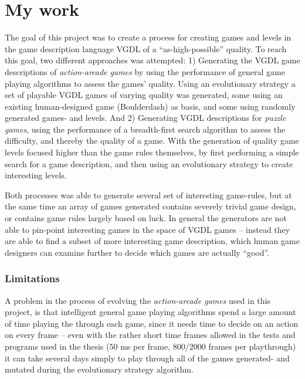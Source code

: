 \documentclass[a4paper,titlepage,final]{report}
\begin{document}
\section{My work}
The goal of this project was to create a process for creating games and levels in the game description language VGDL of a ``as-high-possible'' quality.
To reach this goal, two different approaches was attempted:
1) Generating the VGDL game descriptions of \textit{action-arcade games} by using the performance of general game playing algorithms to assess the games' quality.
Using an evolutionary strategy a set of playable VGDL games of varying quality was generated, some using an existing human-designed game (Boulderdash) as basis, and some using randomly generated games- and levels.
And 2) Generating VGDL descriptions for \textit{puzzle games}, using the performance of a breadth-first search algorithm to assess the difficulty, and thereby the quality of a game.
With the generation of quality game levels focused higher than the game rules themselves, by first performing a simple search for a game description, and then using an evolutionary strategy to create interesting levels. 

Both processes was able to generate several set of interesting game-rules, but at the same time an array of games generated contains severely trivial game design, or contains game rules largely based on luck.
In general the generators are not able to pin-point interesting games in the space of VGDL games -- instead they are able to find a subset of more interesting game description, which human game designers can examine further to decide which games are actually ``good''.

\subsubsection{Limitations}
A problem in the process of evolving the \textit{action-arcade games} used in this project, is that intelligent general game playing algorithms spend a large amount of time playing the through each game, since it needs time to decide on an action on every frame  -- even with the rather short time frames allowed in the tests and programs used in the thesis (50 ms per frame, 800/2000 frames per playthrough) it can take several days simply to play through all of the games generated- and mutated during the evolutionary strategy algorithm.
\end{document}
